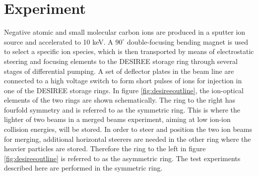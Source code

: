 \documentclass[aps,pra,preprint,superscriptaddress]{revtex4}
\begin{document}
\section{Experiment}
Negative atomic and small molecular carbon ions are produced in a sputter ion source and accelerated to 10 keV. A $90^{\circ}$ double-focusing bending magnet is used to select a specific ion species, which is then transported by means of electrostatic steering and focusing elements to the DESIREE storage ring through several stages of differential pumping. A set of deflector plates in the beam line are connected to a high voltage switch to form short pulses of ions for injection in one of the DESIREE storage rings. In figure \ref{fig:desireeoutline}, the ion-optical elements of the two rings are shown schematically. The ring to the right has fourfold symmetry and is referred to as the symmetric ring.
This is where the lighter of two beams in a merged beams experiment, aiming at low ion-ion collision energies, will be stored. In order to steer and position the two ion beams for merging, additional horizontal steerers are needed in the other ring where the heavier particles are stored. Therefore the ring to the left in figure \ref{fig:desireeoutline} is referred to as the asymmetric ring. The test experiments described here are performed in the symmetric ring.
\end{document}

